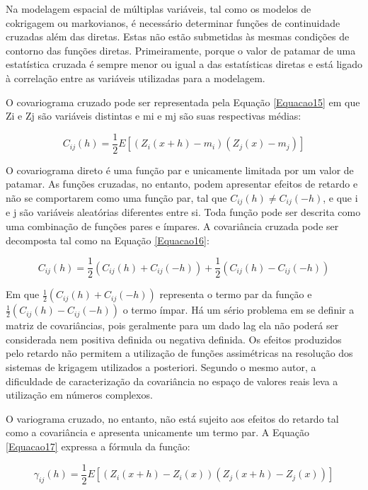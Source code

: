 Na modelagem espacial de múltiplas variáveis, tal como os modelos de cokrigagem ou markovianos, é necessário determinar funções de continuidade cruzadas além das diretas. Estas não estão submetidas às mesmas condições de contorno das funções diretas. Primeiramente, porque o valor de patamar de uma estatística cruzada é sempre menor ou igual a das estatísticas diretas e está ligado à correlação entre as variáveis utilizadas para a modelagem.  

O covariograma cruzado pode ser representada pela Equação \ref{Equacao15} em que Zi e Zj são variáveis distintas e mi e mj são suas respectivas médias: 

\begin{equation}\label{Equacao15}
C_{ij}(h) = \frac{1}{2} E\left[ \left( Z_i(x+h) -m_i \right) \left( Z_j(x) -m_j \right)\right] 
\end{equation}

O covariograma direto é uma função par e unicamente limitada por um valor de patamar. As funções cruzadas, no entanto, podem apresentar efeitos de retardo e não se comportarem como uma função par, tal que $C_{ij} (h)\neq C_{ij} (-h)$, e que i e j são variáveis aleatórias diferentes entre si. 
Toda função pode ser descrita como uma combinação de funções pares e ímpares. A covariância cruzada pode ser decomposta tal como na Equação \ref{Equacao16}:

\begin{equation}\label{Equacao16}
C_{ij}(h) = \frac{1}{2}\left( C_{ij}(h)+C_{ij}(-h)\right) +\frac{1}{2}\left( C_{ij}(h)-C_{ij}(-h)\right)
\end{equation}

Em que $\frac{1}{2}\left( C_{ij}(h)+C_{ij}(-h)\right)$ representa o termo par da função e $\frac{1}{2}\left( C_{ij}(h)-C_{ij}(-h)\right)$ o termo ímpar. Há um sério problema em se definir a matriz de covariâncias, pois geralmente para um dado lag ela não poderá ser considerada nem positiva definida ou negativa definida. Os efeitos produzidos pelo retardo não permitem a utilização de funções assimétricas na resolução dos sistemas de krigagem utilizados a posteriori. Segundo o mesmo autor, a dificuldade de caracterização da covariância no espaço de valores reais leva a utilização em números complexos. 

O variograma cruzado, no entanto, não está sujeito aos efeitos do retardo tal como a covariância e apresenta unicamente um termo par. A Equação \ref{Equacao17} expressa a fórmula da função: 

\begin{equation}\label{Equacao17}
\gamma_{ij}(h) = \frac{1}{2}E\left[ \left( Z_i(x+h) - Z_i(x)\right) \left( Z_j(x+h) - Z_j(x)\right) \right] 
\end{equation}

